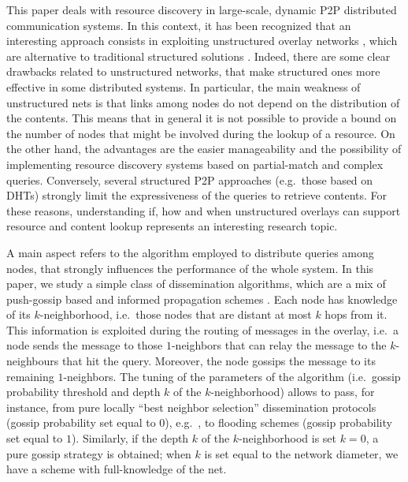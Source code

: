 \documentclass{sig-alternate}
\begin{document}
This paper deals with resource discovery in large-scale, dynamic \ac{P2P} distributed communication systems. In this context, it has been recognized that an interesting approach consists in exploiting unstructured overlay networks \cite{Cholvi:2004,simplex,Keidar:2006}, which are alternative to traditional structured solutions \cite{Hidalgo:2011}. 
Indeed, there are some clear drawbacks related to unstructured networks, that make structured ones more effective in some distributed systems. In particular, the main weakness of unstructured nets is that links among nodes do not depend on the distribution of the contents. 
This means that in general it is not possible to provide a bound on the number of nodes that might be involved during the lookup of a resource.
On the other hand, the advantages are the easier manageability and the possibility of implementing resource discovery systems based on partial-match and complex queries. Conversely, several structured P2P approaches (e.g.~those based on DHTs) strongly limit the expressiveness of the queries to retrieve contents. 
For these reasons, understanding if, how and when unstructured overlays can support resource and content lookup represents an interesting research topic.

A main aspect refers to the algorithm employed to distribute queries among nodes, that strongly influences the performance of the whole system.
In this paper, we study a simple class of dissemination algorithms, which are a mix of push-gossip based and informed propagation schemes \cite{disio11}. Each node has knowledge of its $k$-neighborhood, i.e.~those nodes that are distant at most $k$ hops from it. 
This information is exploited during the routing of messages in the overlay, i.e.~a node sends the message to those $1$-neighbors that can relay the message to the $k$-neighbours that hit the query. Moreover, the node gossips the message to its remaining $1$-neighbors.
The tuning of the parameters of the algorithm (i.e.~gossip probability threshold and depth $k$ of the $k$-neighborhood) allows to pass, for instance, from pure locally ``best neighbor selection'' dissemination protocols (gossip probability set equal to $0$), e.g.~\cite{PuttaswamySZ08}, to flooding schemes (gossip probability set equal to $1$). Similarly, if the depth $k$ of the $k$-neighborhood is set $k=0$, a pure gossip strategy is obtained; when $k$ is set equal to the network diameter, we have a scheme with full-knowledge of the net.
\end{document}
